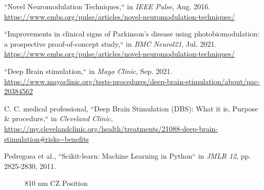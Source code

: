 \documentclass[journal,twoside,web]{ieeecolor}
\begin{document}
\begin{thebibliography}{00}

 ``Novel Neuromodulation Techniques,`` in \emph{IEEE Pulse}, Aug. 2016. 
\url{https://www.embs.org/pulse/articles/novel-neuromodulation-techniques/} 

 ``Improvements in clinical signs of Parkinson's disease using photobiomodulation: a prospective proof-of-concept study,`` in \emph{BMC Neurol21}, Jul. 2021. 
\url{https://www.embs.org/pulse/articles/novel-neuromodulation-techniques/} 

 ``Deep Brain stimulation,`` in \emph{Mayo Clinic}, Sep. 2021. 
\url{https://www.mayoclinic.org/tests-procedures/deep-brain-stimulation/about/pac-20384562}

 C. C. medical professional, ``Deep Brain Stimulation (DBS): What it is, Purpose \& procedure,`` in \emph{Cleveland Clinic}, 
\url{https://my.clevelandclinic.org/health/treatments/21088-deep-brain-stimulation\#risks--benefits}

 Pedregosa et al., ``Scikit-learn: Machine Learning in Python`` in \emph{JMLR 12}, pp. 2825-2830, 2011.

\end{thebibliography}

\begin{figure}[!htb]
    \caption{\label{fig:810-CZ} 810 nm CZ Position}
\end{figure}
\end{document}
